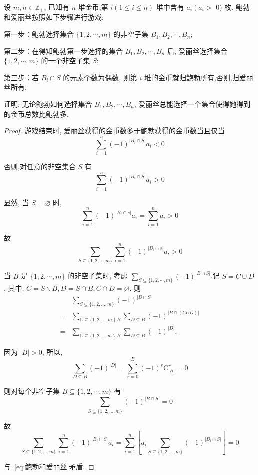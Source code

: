 \begin{example}
	设 $m, n \in \mathbb{Z}_{+}$, 已知有 $n$ 堆金币,第 $i(1 \leqslant i \leqslant n)$ 堆中含有 $a_{i}\left(a_{i}>\right.$ 0) 枚. 鲍勃和爱丽丝按照如下步骤进行游戏:

		第一步：鲍勃选择集合 $\{1,2, \cdots, m\}$ 的非空子集 $B_{1}, B_{2}, \cdots, B_{n}$;

		第二步：在得知鲍勃第一步选择的集合 $B_{1}, B_{2}, \cdots, B_{n}$ 后, 爱丽丝选择集合 $\{1,2, \cdots, m\}$ 的一个非空子集 $S ;$

		第三步：若 $B_{i} \cap S$ 的元素个数为偶数, 则第 $i$ 堆的金币就归鲍勃所有,否则,归爱丽丝所有.

		证明: 无论鲍勃如何选择集合 $B_{1}, B_{2}, \cdots, B_{n}$, 爱丽丝总能选择一个集合使得她得到的金币总数比鲍勃多.
\end{example}

\begin{proof}
	游戏结束时, 爱丽丝获得的金币数多于鲍勃获得的金币数当且仅当
	$$
		\sum_{i=1}^{n}(-1)^{\left|B_{i} \cap S\right|} a_{i}<0
	$$

	否则,对任意的非空集合 $S$ 有
	$$
		\sum_{i=1}^{n}(-1)^{\left|B_{i} \cap S\right|} a_{i}>0
	$$

	显然, 当 $S=\varnothing$ 时,
	$$
		\sum_{i=1}^{n}(-1)^{\left|B_{i} \cap s\right|} a_{i}=\sum_{i=1}^{n} a_{i}>0
	$$

	故
	\begin{equation}
		\sum_{S \subseteq\{1,2, \cdots, m\}} \sum_{i=1}^{n}(-1)^{\left|B_{i} \cap s\right|} a_{i}>0
		\label{eq:鲍勃和爱丽丝}
	\end{equation}

	当 $B$ 是 $\{1,2, \cdots, m\}$ 的非空子集时, 考虑 $\sum_{S \subseteq\{1,2, \cdots, m\}}(-1)^{|B \cap S|}$.记 $S=C \cup D$, 其中, $C=S \backslash B, D=S \cap B, C \cap D=\varnothing$. 则
	$$
		\begin{aligned}
			  & \sum_{S \subseteq\{1,2, \ldots, m\}}(-1)^{|B \cap S|}                                 \\
			= & \sum_{C \subseteq\{1,2, \ldots, m \nmid B} \sum_{D \subseteq B}(-1)^{|B \cap(C U D)|} \\
			= & \sum_{C \subseteq\{1,2, \cdots, m \backslash B} \sum_{D \subseteq B}(-1)^{|D|} .
		\end{aligned}
	$$

	因为 $|B|>0$, 所以,
	$$
		\sum_{D \subseteq B}(-1)^{|D|}=\sum_{r=0}^{|B|}(-1)^{r} \mathrm{C}_{|B|}^{r}=0
	$$

	则对每个非空子集 $B \subseteq\{1,2, \cdots, m\}$ 有
	$$
		\sum_{S \subseteq\{1,2, \ldots, m\}}(-1)^{|B \cap S|}=0
	$$

	故
	$$
		\sum_{S \subseteq\{1,2, \ldots, m\}} \sum_{i=1}^{n}(-1)^{\left|B_{i} \cap S\right|} a_{i}=\sum_{i=1}^{n}\left[a_{i} \sum_{S \subseteq\{1,2, \ldots, m\}}(-1)^{\left|B_{i} \cap S\right|}\right]=0
	$$

	与~\autoref{eq:鲍勃和爱丽丝}矛盾.
\end{proof}

